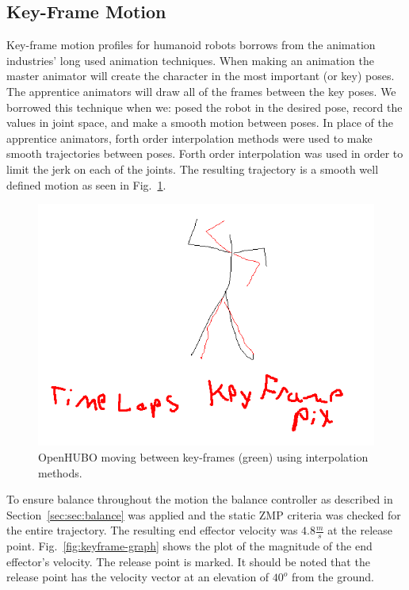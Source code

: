 \subsection{Key-Frame Motion}\label{sec:sec:keyframe}

Key-frame motion profiles for humanoid robots borrows from the animation industries' long used animation techniques.  
When making an animation the master animator will create the character in the most important (or key) poses.  
The apprentice animators will draw all of the frames between the key poses.  
We borrowed this technique when we: posed the robot in the desired pose, record the values in joint space, and make a smooth motion between poses.  
In place of the apprentice animators, forth order interpolation methods were used to make smooth trajectories between poses.  
Forth order interpolation was used in order to limit the jerk on each of the joints.  
The resulting trajectory is a smooth well defined motion as seen in Fig.~\ref{fig:keyframe-throw}.

\begin{figure}[t]
  \centering
\includegraphics[width=1.0\columnwidth]{./pix/fakeThrow.png}
  \caption{OpenHUBO moving between key-frames (green) using interpolation methods.}
  \label{fig:keyframe-throw}
\end{figure}

To ensure balance throughout the motion the balance controller as described in Section~\ref{sec:sec:balance} was applied and the static ZMP criteria was checked for the entire trajectory.
The resulting end effector velocity was $4.8\frac{m}{s}$ at the release point.  
Fig.~\ref{fig:keyframe-graph} shows the plot of the magnitude of the end effector's velocity.  
The release point is marked.  
It should be noted that the release point has the velocity vector at an elevation of $40^o$ from the ground.

